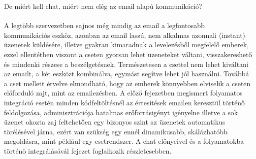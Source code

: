 De miért kell chat, miért nem elég az email alapú kommunikáció?\\
\hfill\\
A legtöbb szervezetben sajnos még mindig az email a legfontosabb kommunikációs eszköz, azonban az email lassú, nem alkalmas azonnali (instant) üzenetek küldésére, illetve gyakran kimaradnak a levelezésből megfelelő emberek, ezzel ellentétben viszont a cseten gyorsan lehet üzeneteket váltani, visszakereshető és mindenki részese a beszélgetésnek. Természetesen a csettel nem lehet kiváltani az emailt, a két eszközt kombinálva, egymást segítve lehet jól használni.
Továbbá a cset mellett érvelve elmondható, hogy az emberek könnyebben elviselik a cseten előforduló zajt, mint az emailezésben. A előző fejezetben megismert folyamatos integráció esetén minden kódfeltöltésnél az értesítések emailen keresztül történő feldolgozása, adminisztrációja hatalmas erőforrásigényt igényelne illetve a sok üzenet okozta zaj feltehetően egy bizonyos szint az üzenetek automatikus törélésével járna, ezért van szükség egy ennél dinamikusabb, skálázhatóbb megoldásra, mint például egy csetrendszer. A chat előnyeivel és a folyamatokba történő integrálásávál  fejezet foglalkozik részletesebben.


